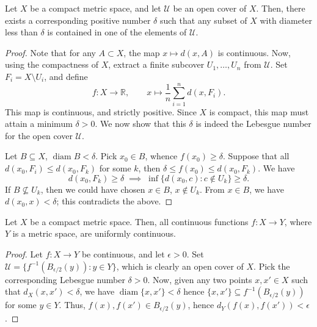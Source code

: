 \documentclass[11pt]{article}
\newcommand{\R}{\mathbb{R}}
\DeclareMathOperator{\diam}{diam}
\theoremstyle{definition}
\theoremstyle{remark}
\numberwithin{equation}{section}
\begin{document}
    \begin{theorem}
        Let $X$ be a compact metric space, and let $\mathscr{U}$ be an open cover of
        $X$. Then, there exists a corresponding positive number $\delta$ such that
        any subset of $X$ with diameter less than $\delta$ is contained in one of the
        elements of $\mathscr{U}$.
    \end{theorem}
    \begin{proof}
        Note that for any $A \subset X$, the map $x \mapsto d(x, A)$ is continuous.
        Now, using the compactness of $X$, extract a finite subcover $U_1, \dots,
        U_n$ from $\mathscr{U}$. Set $F_i = X\setminus U_i$, and define \[
            f\colon X \to \R, \qquad x \mapsto \frac{1}{n}\sum_{i = 1}^n d(x, F_i).
        \] This map is continuous, and strictly positive. Since $X$ is compact, this
        map must attain a minimum $\delta > 0$. We now show that this $\delta$ is
        indeed the Lebesgue number for the open cover $\mathscr{U}$.

        Let $B \subseteq X$, $\diam{B} < \delta$. Pick $x_0 \in B$, whence $f(x_0)
        \geq \delta$. Suppose that all $d(x_0, F_i) \leq d(x_0, F_k)$ for some $k$,
        then $\delta \leq f(x_0) \leq d(x_0, F_k)$. We have \[
            d(x_0, F_k) \geq \delta \;\implies\; \inf\{d(x_0, c) : c \notin U_k\} \geq
            \delta.
        \] If $B \not\subseteq U_k$, then we could have chosen $x \in B$, $x \notin
        U_k$. From $x \in B$, we have $d(x_0, x) < \delta$; this contradicts the
        above.
    \end{proof}
    \begin{corollary}
        Let $X$ be a compact metric space. Then, all continuous functions $f\colon X
        \to Y$, where $Y$ is a metric space, are uniformly continuous.
    \end{corollary}
    \begin{proof}
        Let $f\colon X \to Y$ be continuous, and let $\epsilon > 0$. Set $\mathscr{U}
        = \{f^{-1}(B_{\epsilon / 2}(y)) : y \in Y\}$, which is clearly an open cover
        of $X$. Pick the corresponding Lebesgue number $\delta > 0$. Now, given any
        two points $x, x' \in X$ such that $d_X(x, x') < \delta$, we have $\diam\{x,
        x'\} < \delta$ hence $\{x, x'\} \subseteq f^{-1}(B_{\epsilon / 2}(y))$ for
        some $y \in Y$.  Thus, $f(x), f(x') \in B_{\epsilon / 2}(y)$, hence
        $d_Y(f(x), f(x')) < \epsilon$.
    \end{proof}
\end{document}
